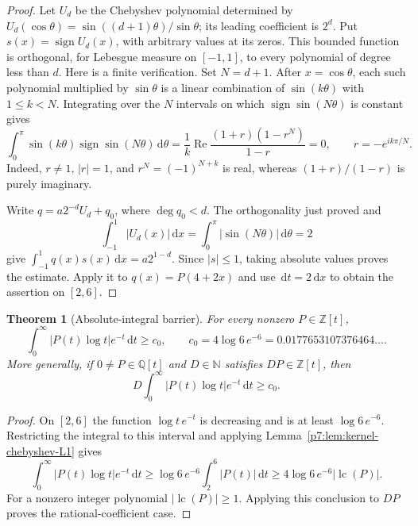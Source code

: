 \documentclass[11pt,a4paper]{article}
\newtheorem{theorem}{Theorem}[section]
\theoremstyle{definition}
\theoremstyle{remark}
\newcommand{\Q}{\mathbb Q}
\newcommand{\Z}{\mathbb Z}
\newcommand{\N}{\mathbb N}
\newcommand{\dd}{\,\mathrm d}
\DeclareMathOperator{\lc}{lc}
\numberwithin{equation}{section}
\begin{document}
\begin{proof}
Let $U_d$ be the Chebyshev polynomial determined by
$U_d(\cos\theta)=\sin((d+1)\theta)/\sin\theta$; its leading
coefficient is $2^d$.  Put $s(x)=\operatorname{sign}U_d(x)$,
with arbitrary values at its zeros.
This bounded function is orthogonal, for Lebesgue measure on $[-1,1]$,
to every polynomial of degree less than $d$.
Here is a finite verification.  Set $N=d+1$.
After $x=\cos\theta$, each such polynomial multiplied by
$\sin\theta$ is a linear combination of $\sin(k\theta)$ with
$1\leq k<N$.  Integrating over the $N$ intervals on which
$\operatorname{sign}\sin(N\theta)$ is constant gives
\[
 \int_0^\pi\sin(k\theta)\operatorname{sign}\sin(N\theta)\dd\theta
 =\frac1k\operatorname{Re}
   \frac{(1+r)(1-r^N)}{1-r}=0,
 \qquad r=-e^{ik\pi/N}.
\]
Indeed, $r\ne1$, $|r|=1$, and $r^N=(-1)^{N+k}$ is real, whereas
$(1+r)/(1-r)$ is purely imaginary.

Write $q=a2^{-d}U_d+q_0$, where $\deg q_0<d$.
The orthogonality just proved and
\[
 \int_{-1}^1|U_d(x)|\dd x
 =\int_0^\pi|\sin(N\theta)|\dd\theta=2
\]
give $\int_{-1}^1 q(x)s(x)\dd x=a2^{1-d}$.
Since $|s|\leq1$, taking absolute values proves the estimate.
Apply it to $q(x)=P(4+2x)$ and use $\dd t=2\dd x$ to obtain
the assertion on $[2,6]$.
\end{proof}

\begin{theorem}[Absolute-integral barrier]\label{p7:thm:kernel-absolute-gap}
For every nonzero $P\in\Z[t]$,
\begin{equation}\label{p7:eq:kernel-absolute-gap}
 \int_0^\infty|P(t)\log t|e^{-t}\dd t
 \geq c_0,\qquad
 c_0=4\log6\,e^{-6}=0.0177653107376464\ldots.
\end{equation}
More generally, if $0\ne P\in\Q[t]$ and $D\in\N$ satisfies
$DP\in\Z[t]$, then
\[
 D\int_0^\infty|P(t)\log t|e^{-t}\dd t\geq c_0.
\]
\end{theorem}

\begin{proof}
On $[2,6]$ the function $\log t\,e^{-t}$ is decreasing and is at
least $\log6\,e^{-6}$.  Restricting the integral to this interval and
applying Lemma~\ref{p7:lem:kernel-chebyshev-L1} gives
\[
 \int_0^\infty|P(t)\log t|e^{-t}\dd t
 \geq \log6\,e^{-6}\int_2^6|P(t)|\dd t
 \geq4\log6\,e^{-6}|\lc(P)|.
\]
For a nonzero integer polynomial $|\lc(P)|\geq1$.
Applying this conclusion to $DP$ proves the rational-coefficient case.
\end{proof}
\end{document}

